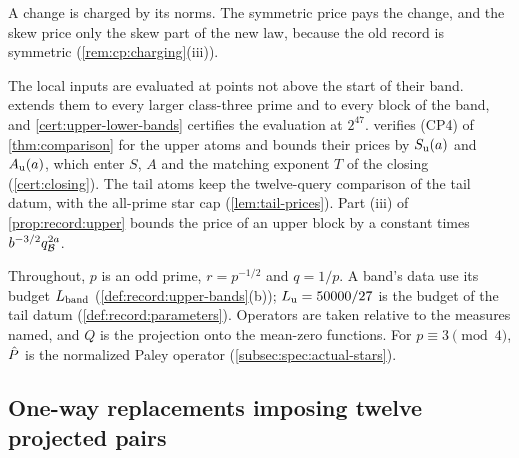 A change is charged by its norms. The symmetric price pays the change, and the
skew price only the skew part of the new law, because the old record is
symmetric (\cref{rem:cp:charging}(iii)).

The local inputs are evaluated at points not above the start of their band.
 extends them to every larger class-three prime and to
every block of the band, and \cref{cert:upper-lower-bands} certifies the
evaluation at $2^{47}$.  verifies (CP4) of
\cref{thm:comparison} for the upper atoms and bounds their prices by
$S_{\rm u}(a)$ and $A_{\rm u}(a)$, which enter $S$, $A$ and the matching exponent
$T$ of the closing (\cref{cert:closing}). The tail atoms keep the twelve-query
comparison of the tail datum, with the all-prime star cap
(\cref{lem:tail-prices}). Part (iii) of \cref{prop:record:upper} bounds the price
of an upper block by a constant times $b^{-3/2}q_\mathcal B^{2a}$.

Throughout, $p$ is an odd prime, $r=p^{-1/2}$ and $q=1/p$. A band's data use its
budget $L_{\rm band}$ (\cref{def:record:upper-bands}(b)); $L_{\rm u}=50000/27$ is the
budget of the tail datum (\cref{def:record:parameters}). Operators are taken
relative to the measures named, and $Q$ is the projection onto the mean-zero
functions. For $p\equiv3\pmod4$, $\hat P$ is the normalized Paley operator
(\cref{subsec:spec:actual-stars}).

\subsection{One-way replacements imposing twelve projected pairs}\label{sec:frontier:upper-oneway}

